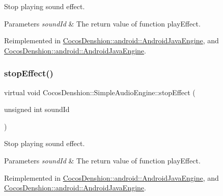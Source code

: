 Stop playing sound effect.


\begin{DoxyParams}{Parameters}
{\em sound\+Id} & The return value of function play\+Effect. \\
\hline
\end{DoxyParams}


Reimplemented in \hyperlink{classCocosDenshion_1_1android_1_1AndroidJavaEngine_ad8b01c7f29f3536fdb509b00678f6156}{Cocos\+Denshion\+::android\+::\+Android\+Java\+Engine}, and \hyperlink{classCocosDenshion_1_1android_1_1AndroidJavaEngine_ad400c573b14ae0a45e3977808acae5fb}{Cocos\+Denshion\+::android\+::\+Android\+Java\+Engine}.

\mbox{\label{classCocosDenshion_1_1SimpleAudioEngine_a1059fb2535cf1decec6b8889f3692c2b}} 
\subsubsection{\texorpdfstring{stop\+Effect()}{stopEffect()}\hspace{0.1cm}{\footnotesize\ttfamily [2/2]}}
{\footnotesize\ttfamily virtual void Cocos\+Denshion\+::\+Simple\+Audio\+Engine\+::stop\+Effect (\begin{DoxyParamCaption}\item[{unsigned int}]{sound\+Id }\end{DoxyParamCaption})\hspace{0.3cm}{\ttfamily [virtual]}}

Stop playing sound effect.


\begin{DoxyParams}{Parameters}
{\em sound\+Id} & The return value of function play\+Effect. \\
\hline
\end{DoxyParams}


Reimplemented in \hyperlink{classCocosDenshion_1_1android_1_1AndroidJavaEngine_ad8b01c7f29f3536fdb509b00678f6156}{Cocos\+Denshion\+::android\+::\+Android\+Java\+Engine}, and \hyperlink{classCocosDenshion_1_1android_1_1AndroidJavaEngine_ad400c573b14ae0a45e3977808acae5fb}{Cocos\+Denshion\+::android\+::\+Android\+Java\+Engine}.

\mbox{\label{classCocosDenshion_1_1SimpleAudioEngine_ad370e42405e90a0701fe9ee63d29c8e1}} 
